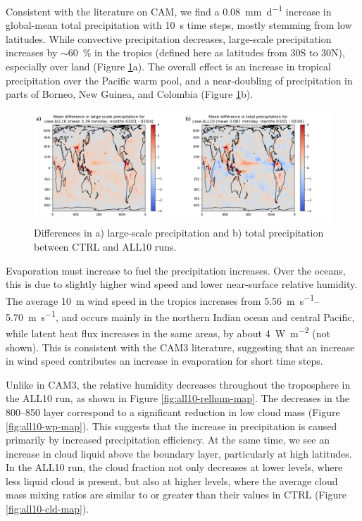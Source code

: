 \documentclass [11pt, proquest] {uwthesis}[2020/02/24]
\begin{document}
Consistent with the literature on CAM, we find a \SI{0.08}{\milli\meter\per\day} increase in global-mean total precipitation with \SI{10}{\second} time steps, mostly stemming from low latitudes. While convective precipitation decreases, large-scale precipitation increases by $\sim$\SI{60}{\percent} in the tropics (defined here as latitudes from \num{30}S to \num{30}N), especially over land (Figure \ref{fig:all10-prec-map}a). The overall effect is an increase in tropical precipitation over the Pacific warm pool, and a near-doubling of precipitation in parts of Borneo, New Guinea, and Colombia (Figure \ref{fig:all10-prec-map}b).

\begin{figure}
    \centering
    \includegraphics[width=5.5in]{Figure1.png}
    \caption{Differences in a) large-scale precipitation and b) total precipitation between CTRL and ALL10 runs.}
    \label{fig:all10-prec-map}
\end{figure}

Evaporation must increase to fuel the precipitation increases.  Over the oceans, this is due to slightly higher wind speed and lower near-surface relative humidity. The average \SI{10}{\meter} wind speed in the tropics increases from \SIrange{5.56}{5.70}{\meter\per\second}, and occurs mainly in the northern Indian ocean and central Pacific, while latent heat flux increases in the same areas, by about \SI{4}{\watt\per\meter\squared} (not shown). This is consistent with the CAM3 literature, suggesting that an increase in wind speed contributes an increase in evaporation for short time steps.

Unlike in CAM3, the relative humidity decreases throughout the troposphere in the ALL10 run, as shown in Figure \ref{fig:all10-relhum-map}. The decreases in the \SIrange[range-phrase=--,range-units=single]{800}{850}{\millibar} layer correspond to a significant reduction in low cloud mass (Figure \ref{fig:all10-wp-map}). This suggests that the increase in precipitation is caused primarily by increased precipitation efficiency. At the same time, we see an increase in cloud liquid above the boundary layer, particularly at high latitudes. In the ALL10 run, the cloud fraction not only decreases at lower levels, where less liquid cloud is present, but also at higher levels, where the average cloud mass mixing ratios are similar to or greater than their values in CTRL (Figure \ref{fig:all10-cld-map}).
\end{document}
